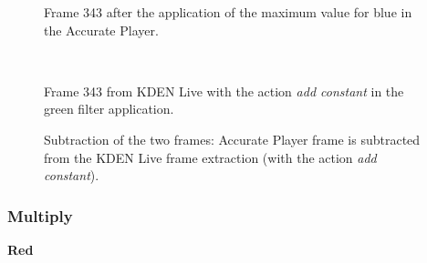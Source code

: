 \documentclass[../MasterThesis.tex]{subfiles}
\begin{document}
\begin{minipage}{0.48\textwidth}
	\begin{figure}[H]
		\begin{center}
			\caption[]{\small Frame 343 after the application of the maximum value for blue in the Accurate Player.}
		\end{center}
	\end{figure}
\end{minipage}\begin{minipage}{0.04\textwidth}
	\ 
\end{minipage}\begin{minipage}{0.48\textwidth}
	\begin{figure}[H]
		\begin{center}
			\caption[]{\small Frame 343 from KDEN Live with the action \textit{add constant} in the green filter application.}
		\end{center}
	\end{figure}
\end{minipage}

\vspace*{-1em}



\begin{figure}[H]
	\begin{center}
		\caption[]{\small Subtraction of the two frames: Accurate Player frame is subtracted from the KDEN Live frame extraction (with the action \textit{add constant}).}
	\end{center}
\end{figure}

















\subsubsection*{Multiply}


\textbf{Red}

\vspace*{-1em}
\end{document}
